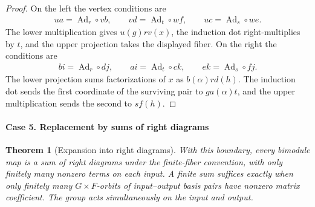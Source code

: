 \documentclass[11pt,a4paper]{article}
\numberwithin{equation}{section}
\newtheorem{theorem}{Theorem}[section]
\theoremstyle{definition}
\begin{document}
\begin{proof}
On the left the vertex conditions are
\[
 \begin{gathered}
 ua=\operatorname{Ad}_r\circ vb,\qquad
 vd=\operatorname{Ad}_t\circ wf,\qquad
 uc=\operatorname{Ad}_s\circ we .
 \end{gathered}
\]
The lower multiplication gives \(u(g)r v(x)\), the induction dot
right-multiplies by \(t\), and the upper projection takes the displayed
fiber. On the right the conditions are
\[
 \begin{gathered}
 bi=\operatorname{Ad}_r\circ dj,\qquad
 ai=\operatorname{Ad}_t\circ ck,\qquad
 ek=\operatorname{Ad}_s\circ fj .
 \end{gathered}
\]
The lower projection sums factorizations of \(x\) as \(b(\alpha)r d(h)\).
The induction dot sends the first coordinate of the surviving pair
to \(ga(\alpha)t\), and the upper multiplication sends the second
to \(s f(h)\).
\end{proof}

\paragraph{Case 5. Replacement by sums of right diagrams}\mbox{}\par

\begin{theorem}[Expansion into right diagrams]\label{thm:three-orbits}
With this boundary, every bimodule map is a sum of right diagrams
under the finite-fiber convention, with only finitely many nonzero
terms on each input. A finite sum suffices exactly when only
finitely many \(G\times F\)-orbits of input--output basis pairs
have nonzero matrix coefficient. The group acts simultaneously
on the input and output.
\end{theorem}
\end{document}
